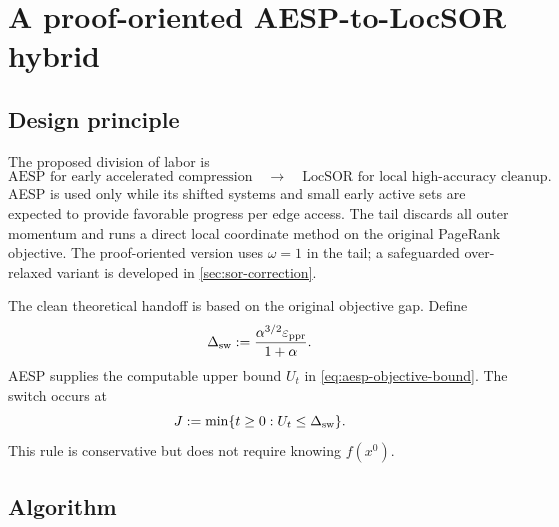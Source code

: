 \section{A proof-oriented AESP-to-LocSOR hybrid}
\label{sec:hybrid-algorithm}

\subsection{Design principle}

The proposed division of labor is
\begin{equation}
    \boxed{
    \text{AESP for early accelerated compression}
    \quad\longrightarrow\quad
    \text{LocSOR for local high-accuracy cleanup}.}
    \label{eq:hybrid-principle}
\end{equation}
AESP is used only while its shifted systems and small early active sets are
expected to provide favorable progress per edge access.  The tail discards all
outer momentum and runs a direct local coordinate method on the original
PageRank objective.  The proof-oriented version uses \(\omega=1\) in the tail;
a safeguarded over-relaxed variant is developed in \cref{sec:sor-correction}.

The clean theoretical handoff is based on the original objective gap.  Define
\begin{equation}
    \Delta_{\rm sw}
    :=\frac{\alpha^{3/2}\varepsilon_{\mathrm{ppr}}}{1+\alpha}.
    \label{eq:switch-gap}
\end{equation}
AESP supplies the computable upper bound \(U_t\) in
\cref{eq:aesp-objective-bound}.  The switch occurs at
\begin{equation}
    J
    :=\min\{t\geq0:U_t\leq\Delta_{\rm sw}\}.
    \label{eq:switch-stage}
\end{equation}
This rule is conservative but does not require knowing \(f(x^0)\).

\subsection{Algorithm}


